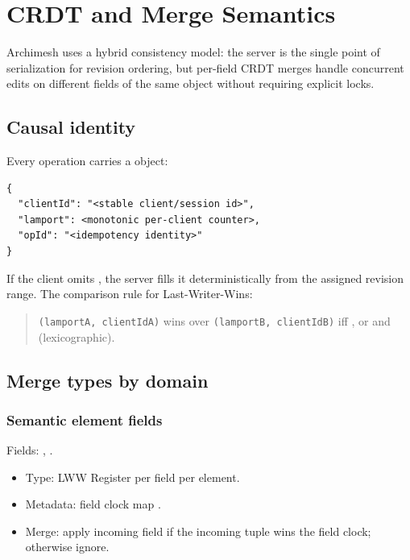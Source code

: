 \section{CRDT and Merge Semantics}
\label{sec:CrdtAndMerge}

Archimesh uses a hybrid consistency model: the server is the single point of
serialization for revision ordering, but per-field CRDT merges handle
concurrent edits on different fields of the same object without requiring
explicit locks.

\subsection{Causal identity}

Every operation carries a  object:

\begin{lstlisting}[caption={Causal metadata}]
{
  "clientId": "<stable client/session id>",
  "lamport": <monotonic per-client counter>,
  "opId": "<idempotency identity>"
}
\end{lstlisting}

If the client omits , the server fills it deterministically
from the assigned revision range. The comparison rule for Last-Writer-Wins:

\begin{quote}
\texttt{(lamportA,{} clientIdA)} wins over \texttt{(lamportB,{} clientIdB)} iff
, or  and
 (lexicographic).
\end{quote}

\subsection{Merge types by domain}

\subsubsection{Semantic element fields}

Fields: , .

\begin{itemize}
\item Type: LWW Register per field per element.
\item Metadata: field clock map .
\item Merge: apply incoming field if the incoming tuple wins the field clock;
  otherwise ignore.
\end{itemize}

